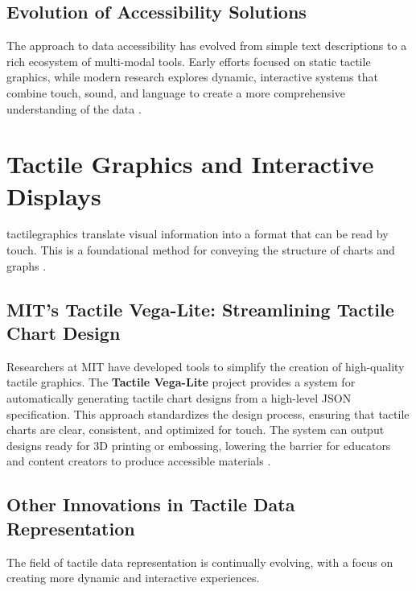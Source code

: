 \subsection{Evolution of Accessibility Solutions}\label{ch13:ssec:evolution}
The approach to data accessibility has evolved from simple text descriptions to a rich ecosystem of multi-modal tools. Early efforts focused on static tactile graphics, while modern research explores dynamic, interactive systems that combine touch, sound, and language to create a more comprehensive understanding of the data \supercite{Zewe2022Making, Lundgard2022Accessible}.

\section{Tactile Graphics and Interactive Displays}\label{ch13:sec:tactile-graphics}
\gls{tactilegraphics} translate visual information into a format that can be read by touch. This is a foundational method for conveying the structure of charts and graphs \supercite{CreatingTactileGraphics}.

\subsection{MIT's Tactile Vega-Lite: Streamlining Tactile Chart Design}\label{ch13:ssec:tactile-vega-lite}
Researchers at MIT have developed tools to simplify the creation of high-quality tactile graphics. The \textbf{Tactile Vega-Lite} project provides a system for automatically generating tactile chart designs from a high-level JSON specification. This approach standardizes the design process, ensuring that tactile charts are clear, consistent, and optimized for touch. The system can output designs ready for 3D printing or embossing, lowering the barrier for educators and content creators to produce accessible materials \supercite{TactileVegaLite}.

\subsection{Other Innovations in Tactile Data Representation}\label{ch13:ssec:tactile-innovations}
The field of tactile data representation is continually evolving, with a focus on creating more dynamic and interactive experiences.


